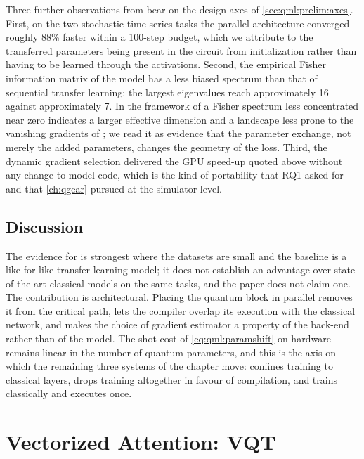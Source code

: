 Three further observations from \cite{guo2025qpie} bear on the design axes of \cref{sec:qml:prelim:axes}. First, on the two stochastic time-series tasks the parallel architecture converged roughly 88\% faster within a 100-step budget, which we attribute to the transferred parameters being present in the circuit from initialization rather than having to be learned through the activations. Second, the empirical Fisher information matrix of the \qpie{} model has a less biased spectrum than that of sequential transfer learning: the largest eigenvalues reach approximately 16 against approximately 7. In the framework of \cite{abbas2021powerqnn} a Fisher spectrum less concentrated near zero indicates a larger effective dimension and a landscape less prone to the vanishing gradients of \cite{mcclean2018barren}; we read it as evidence that the parameter exchange, not merely the added parameters, changes the geometry of the loss. Third, the dynamic gradient selection delivered the GPU speed-up quoted above without any change to model code, which is the kind of portability that RQ1 asked for and that \cref{ch:qgear} pursued at the simulator level.

\subsection{Discussion}\label{sec:qml:qpie:discussion}

The evidence for \qpie{} is strongest where the datasets are small and the baseline is a like-for-like transfer-learning model; it does not establish an advantage over state-of-the-art classical models on the same tasks, and the paper does not claim one. The contribution is architectural. Placing the quantum block in parallel removes it from the critical path, lets the compiler overlap its execution with the classical network, and makes the choice of gradient estimator a property of the back-end rather than of the model. The shot cost of \cref{eq:qml:paramshift} on hardware remains linear in the number of quantum parameters, and this is the axis on which the remaining three systems of the chapter move: \vqt{} confines training to classical layers, \shardq{} drops training altogether in favour of compilation, and \nnqa{} trains classically and executes once.

\section{Vectorized Attention: VQT}\label{sec:qml:vqt}

